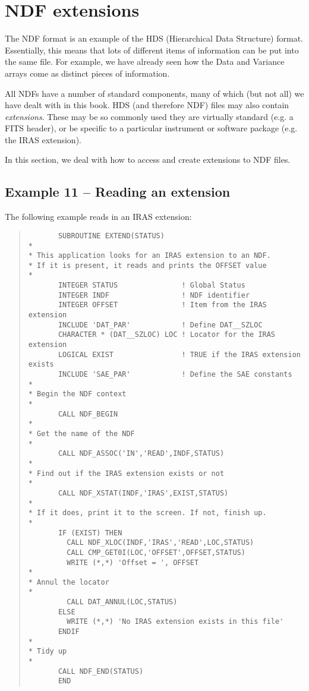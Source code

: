 \section{NDF extensions}

The NDF format is an example of the HDS (Hierarchical Data Structure) format.
Essentially, this means that lots of different items of
information can be put into the same file. For example, we have
already seen how the Data and Variance arrays come as distinct pieces
of information.

All NDFs have a number of standard components, many of which (but not
all) we have dealt with in this book. HDS (and therefore NDF) files
may
also contain {\em extensions}. These may be so commonly used they are
virtually standard (e.g. a FITS header), or be specific to a particular
instrument or software package (e.g. the IRAS extension).

In this section, we deal with how to access and create extensions to
NDF files. 

\subsection{Example 11 -- Reading an extension}

The following example reads in an IRAS extension:

\begin{quote}
{\small
\begin{verbatim}
       SUBROUTINE EXTEND(STATUS)
*
* This application looks for an IRAS extension to an NDF.
* If it is present, it reads and prints the OFFSET value
*
       INTEGER STATUS               ! Global Status
       INTEGER INDF                 ! NDF identifier 
       INTEGER OFFSET               ! Item from the IRAS extension
       INCLUDE 'DAT_PAR'            ! Define DAT__SZLOC
       CHARACTER * (DAT__SZLOC) LOC ! Locator for the IRAS extension
       LOGICAL EXIST                ! TRUE if the IRAS extension exists
       INCLUDE 'SAE_PAR'            ! Define the SAE constants
*
* Begin the NDF context
*
       CALL NDF_BEGIN
*
* Get the name of the NDF
*
       CALL NDF_ASSOC('IN','READ',INDF,STATUS)
*
* Find out if the IRAS extension exists or not
*
       CALL NDF_XSTAT(INDF,'IRAS',EXIST,STATUS)
*
* If it does, print it to the screen. If not, finish up.
*
       IF (EXIST) THEN
         CALL NDF_XLOC(INDF,'IRAS','READ',LOC,STATUS)
         CALL CMP_GET0I(LOC,'OFFSET',OFFSET,STATUS)
         WRITE (*,*) 'Offset = ', OFFSET
*
* Annul the locator
*
         CALL DAT_ANNUL(LOC,STATUS)
       ELSE
         WRITE (*,*) 'No IRAS extension exists in this file'
       ENDIF
*
* Tidy up
*
       CALL NDF_END(STATUS)
       END
\end{verbatim}
}
\end{quote}

